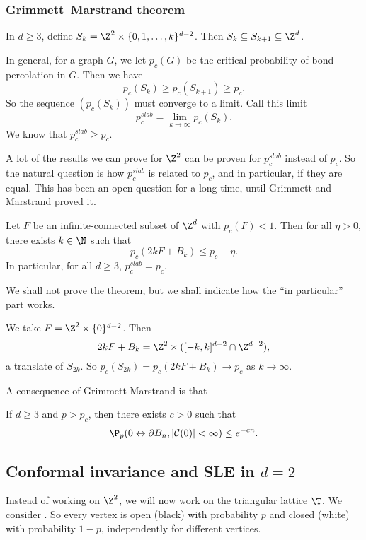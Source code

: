 \documentclass[a4paper]{article}
\begin{document}
\subsubsection*{Grimmett--Marstrand theorem}

In $d \geq 3$, define $S_k = \Z^2 \times \{0, 1, \ldots, k\}^{d - 2}$. Then $S_k \subseteq S_{k + 1} \subseteq \Z^d$.

In general, for a graph $G$, we let $p_c(G)$ be the critical probability of bond percolation in $G$. Then we have
\[
  p_c(S_k) \geq p_c(S_{k + 1}) \geq p_c.
\]
So the sequence $(p_c(S_k))$ must converge to a limit. Call this limit
\[
  p_c^{slab} = \lim_{k \to \infty} p_c(S_k).
\]
We know that $p_c^{slab} \geq p_c$.

A lot of the results we can prove for $\Z^2$ can be proven for $p_c^{slab}$ instead of $p_c$. So the natural question is how $p_c^{slab}$ is related to $p_c$, and in particular, if they are equal. This has been an open question for a long time, until Grimmett and Marstrand proved it.

\begin{thm}
  Let $F$ be an infinite-connected subset of $\Z^d$ with $p_c(F) < 1$. Then for all $\eta > 0$, there exists $k \in \N$ such that
  \[
    p_c(2k F + B_k) \leq p_c + \eta.
  \]
  In particular, for all $d \geq 3$, $p_c^{slab} = p_c$.
\end{thm}
We shall not prove the theorem, but we shall indicate how the ``in particular'' part works.

We take $F = \Z^2 \times \{0\}^{d - 2}$. Then
\[
  2kF + B_k = \Z^2 \times ([-k, k]^{d - 2} \cap \Z^{d - 2}),
\]
a translate of $S_{2k}$. So $p_c(S_{2k}) = p_c(2kF + B_k) \to p_c$ as $k \to \infty$.

A consequence of Grimmett-Marstrand is that
\begin{thm}
  If $d \geq 3$ and $p > p_c$, then there exists $c > 0$ such that
  \[
    \P_p(0 \leftrightarrow \partial B_n, |\mathcal{C}(0)| < \infty) \leq e^{-cn}.
  \]
\end{thm}

\subsection{Conformal invariance and SLE in \texorpdfstring{$d = 2$}{d = 2}}
Instead of working on $\Z^2$, we will now work on the triangular lattice $\T$. We consider . So every vertex is open (black) with probability $p$ and closed (white) with probability $1 - p$, independently for different vertices.
\end{document}
